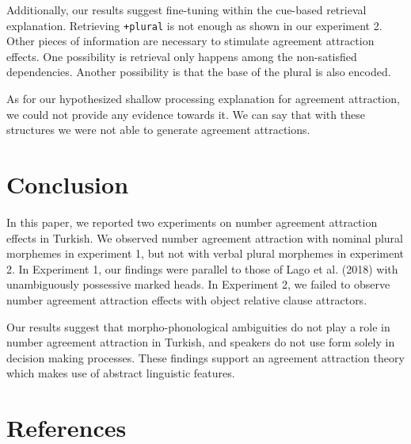 \documentclass[
  english,
  doc,floatsintext]{apa6}
\begin{document}
Additionally, our results suggest fine-tuning within the cue-based retrieval explanation. Retrieving \texttt{+plural} is not enough as shown in our experiment 2. Other pieces of information are necessary to stimulate agreement attraction effects. One possibility is retrieval only happens among the non-satisfied dependencies. Another possibility is that the base of the plural is also encoded.

As for our hypothesized shallow processing explanation for agreement attraction, we could not provide any evidence towards it. We can say that with these structures we were not able to generate agreement attractions.

\hypertarget{conclusion}{%
\section{Conclusion}\label{conclusion}}

In this paper, we reported two experiments on number agreement attraction effects in Turkish. We observed number agreement attraction with nominal plural morphemes in experiment 1, but not with verbal plural morphemes in experiment 2. In Experiment 1, our findings were parallel to those of Lago et al. (2018) with unambiguously possessive marked heads. In Experiment 2, we failed to observe number agreement attraction effects with object relative clause attractors.

Our results suggest that morpho-phonological ambiguities do not play a role in number agreement attraction in Turkish, and speakers do not use form solely in decision making processes. These findings support an agreement attraction theory which makes use of abstract linguistic features.

\hypertarget{references}{%
\section{References}\label{references}}

\begingroup
\setlength{\parindent}{-0.5in}
\end{document}

